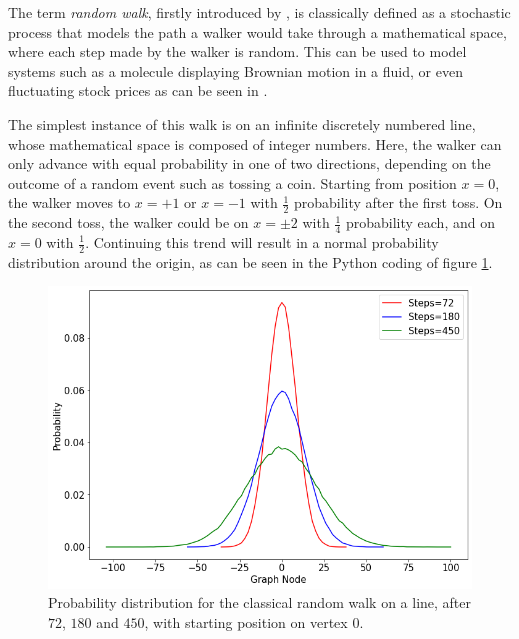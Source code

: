 \documentclass[../../dissertation.tex]{subfiles}
\begin{document}
The term \textit{random walk}, firstly introduced by \cite{kpearson1905}, is
classically defined as a stochastic process that models the path a walker would
take through a mathematical space, where each step made by the walker is
random. This can be used to model systems such as a molecule displaying
Brownian motion in a fluid, or even fluctuating stock prices as can be seen in
\cite{sottinen2001}.\par The simplest instance of this walk is on an infinite
discretely numbered line, whose mathematical space is composed of integer
numbers. Here, the walker can only advance with equal probability in one of two
directions, depending on the outcome of a random event such as tossing a coin.
Starting from position $x=0$, the walker moves to $x = +1$ or $ x = -1$ with
$\frac{1}{2}$ probability after the first toss. On the second toss, the walker
could be on $x =\pm 2$ with $\frac{1}{4}$ probability each, and on $x = 0$ with
$\frac{1}{2}$.  Continuing this trend will result in a normal probability
distribution around the origin, as can be seen in the Python coding of figure
\ref{fig:MultClassicalWalk72180450}.
\begin{figure}[!h]
	\centering
	\includegraphics[scale=0.40]{img/ClassicalWalk/MultClassicalWalk72180450}
	\caption{Probability distribution for the classical random walk on a line, after $72$, $180$ and $450$, with starting position on vertex $0$.} 
	\label{fig:MultClassicalWalk72180450}
\end{figure}\par
\end{document}
